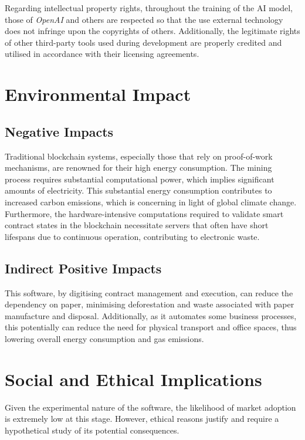 Regarding intellectual property rights, throughout the training of the AI model, those of \textit{OpenAI} and others are respected so that the use external technology does not infringe upon the copyrights of others. Additionally, the legitimate rights of other third-party tools used during development are properly credited and utilised in accordance with their licensing agreements.

\section{Environmental Impact}

\subsection{Negative Impacts}

Traditional blockchain systems, especially those that rely on proof-of-work mechanisms, are renowned for their high energy consumption. The mining process requires substantial computational power, which implies significant amounts of electricity. This substantial energy consumption contributes to increased carbon emissions, which is concerning in light of global climate change. Furthermore, the hardware-intensive computations required to validate smart contract states in the blockchain necessitate servers that often have short lifespans due to continuous operation, contributing to electronic waste.

\subsection{Indirect Positive Impacts}

This software, by digitising contract management and execution, can reduce the dependency on paper, minimising deforestation and waste associated with paper manufacture and disposal. Additionally, as it automates some business processes, this potentially can reduce the need for physical transport and office spaces, thus lowering overall energy consumption and gas emissions.

\section{Social and Ethical Implications}

Given the experimental nature of the software, the likelihood of market adoption is extremely low at this stage. However, ethical reasons justify and require a hypothetical study of its potential consequences.

